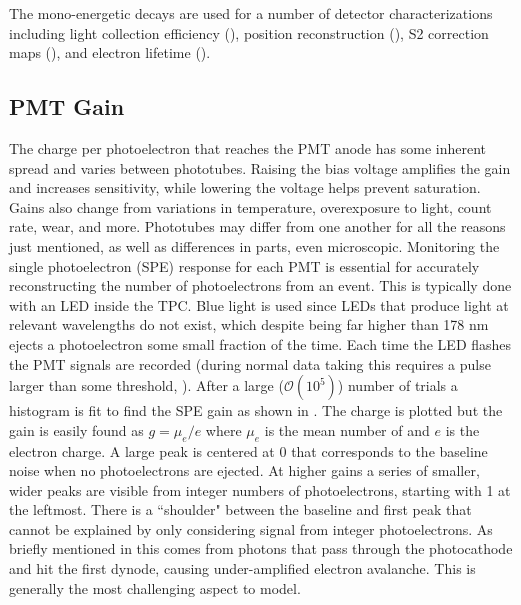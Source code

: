 The mono-energetic decays are used for a number of
detector characterizations including light collection efficiency (), position reconstruction
(), S2 correction maps (), and electron
lifetime ().


\subsection{PMT Gain}
\label{subsec:det_char_pmt_gain}
The charge per photoelectron that reaches the PMT anode has some inherent spread and varies between phototubes.  Raising the bias
voltage amplifies
the gain and increases sensitivity, while lowering the voltage helps prevent saturation.  Gains also change from variations in
temperature, overexposure to light, count rate, wear, and more.  Phototubes may differ from one another
for all the reasons just mentioned, as well as differences in parts, even microscopic.  Monitoring the single photoelectron (SPE)
response for each PMT is essential for accurately reconstructing the number of photoelectrons from an
event.  This is typically done with an LED inside the TPC.  Blue light is used since LEDs that produce light at relevant wavelengths do
not exist, which despite
being far higher than 178 nm ejects a photoelectron some small fraction of the time.  Each time the LED flashes the PMT signals are
recorded (during normal data taking this requires a pulse larger than some threshold, ).  After a large
($\mathcal{O}(10^{5})$)
number of trials a histogram is fit to find the SPE gain as shown in .  The charge is plotted but the gain is
easily found as $g = \mu_{e} / e$ where $\mu_{e}$ is the mean number of \electron and $e$ is the electron charge.  A large peak is
centered at 0 that corresponds to the baseline noise when no photoelectrons are ejected.  At higher gains a series of
smaller, wider peaks are visible from integer numbers of photoelectrons, starting with 1 at the leftmost.  There is a ``shoulder"
between the baseline and first peak that cannot be explained by only considering signal from integer photoelectrons.  As briefly mentioned
in
 this comes from photons that pass through the photocathode and hit the first dynode, causing
under-amplified electron avalanche.  This is generally the most challenging aspect to model.

